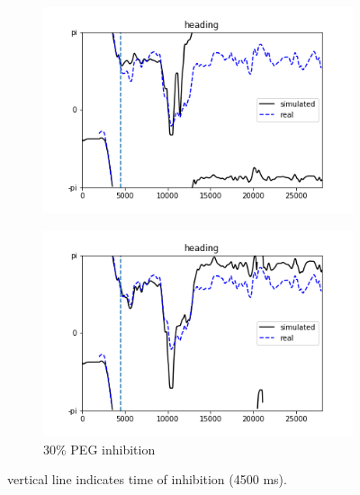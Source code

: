 \documentclass{article}
\begin{document}
\begin{figure}[h]
	\centering
	\begin{subfigure}[t]{0.48\linewidth}
		\centering
		\includegraphics[width = 1.0\linewidth, trim={0 0 0 0}, clip=true]{../figures/sim_head_PEN1_07.png}
		\label{fig:F}	
	\end{subfigure}
	\hspace{0.01\linewidth}
	\begin{subfigure}[t]{0.48\linewidth}
		\centering
		\includegraphics[width = 1.0\linewidth, trim={0 0 0 0}, clip=true]{../figures/sim_head_PEG_07.png}
		\caption{30\% PEG inhibition}
		\label{fig:dF}
	\end{subfigure}
\caption{vertical line indicates time of inhibition (4500 ms).}
\label{fig:trackPP}
\end{figure}

\newpage
\end{document}
